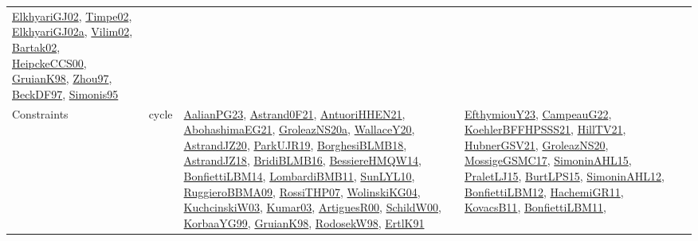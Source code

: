 {\begin{longtable}{lp{3cm}>{\raggedright}p{6cm}>{\raggedright}p{6cm}p{8cm}}
\href{papers/ElkhyariGJ02.pdf}{ElkhyariGJ02}\cite{ElkhyariGJ02}, \href{articles/Timpe02.pdf}{Timpe02}\cite{Timpe02}, \href{papers/ElkhyariGJ02a.pdf}{ElkhyariGJ02a}\cite{ElkhyariGJ02a}, \href{papers/Vilim02.pdf}{Vilim02}\cite{Vilim02}, \href{papers/Bartak02.pdf}{Bartak02}\cite{Bartak02}, \href{articles/HeipckeCCS00.pdf}{HeipckeCCS00}\cite{HeipckeCCS00}, \href{papers/GruianK98.pdf}{GruianK98}\cite{GruianK98}, \href{articles/Zhou97.pdf}{Zhou97}\cite{Zhou97}, \href{papers/BeckDF97.pdf}{BeckDF97}\cite{BeckDF97}, \href{papers/Simonis95.pdf}{Simonis95}\cite{Simonis95}\\
Constraints & cycle & \href{papers/AalianPG23.pdf}{AalianPG23}\cite{AalianPG23}, \href{papers/Astrand0F21.pdf}{Astrand0F21}\cite{Astrand0F21}, \href{papers/AntuoriHHEN21.pdf}{AntuoriHHEN21}\cite{AntuoriHHEN21}, \href{articles/AbohashimaEG21.pdf}{AbohashimaEG21}\cite{AbohashimaEG21}, \href{papers/GroleazNS20a.pdf}{GroleazNS20a}\cite{GroleazNS20a}, \href{articles/WallaceY20.pdf}{WallaceY20}\cite{WallaceY20}, \href{articles/AstrandJZ20.pdf}{AstrandJZ20}\cite{AstrandJZ20}, \href{papers/ParkUJR19.pdf}{ParkUJR19}\cite{ParkUJR19}, \href{articles/BorghesiBLMB18.pdf}{BorghesiBLMB18}\cite{BorghesiBLMB18}, \href{papers/AstrandJZ18.pdf}{AstrandJZ18}\cite{AstrandJZ18}, \href{articles/BridiBLMB16.pdf}{BridiBLMB16}\cite{BridiBLMB16}, \href{papers/BessiereHMQW14.pdf}{BessiereHMQW14}\cite{BessiereHMQW14}, \href{articles/BonfiettiLBM14.pdf}{BonfiettiLBM14}\cite{BonfiettiLBM14}, \href{papers/LombardiBMB11.pdf}{LombardiBMB11}\cite{LombardiBMB11}, \href{papers/SunLYL10.pdf}{SunLYL10}\cite{SunLYL10}, \href{articles/RuggieroBBMA09.pdf}{RuggieroBBMA09}\cite{RuggieroBBMA09}, \href{papers/RossiTHP07.pdf}{RossiTHP07}\cite{RossiTHP07}, \href{papers/WolinskiKG04.pdf}{WolinskiKG04}\cite{WolinskiKG04}, \href{articles/KuchcinskiW03.pdf}{KuchcinskiW03}\cite{KuchcinskiW03}, \href{papers/Kumar03.pdf}{Kumar03}\cite{Kumar03}, \href{articles/ArtiguesR00.pdf}{ArtiguesR00}\cite{ArtiguesR00}, \href{articles/SchildW00.pdf}{SchildW00}\cite{SchildW00}, \href{papers/KorbaaYG99.pdf}{KorbaaYG99}\cite{KorbaaYG99}, \href{papers/GruianK98.pdf}{GruianK98}\cite{GruianK98}, \href{papers/RodosekW98.pdf}{RodosekW98}\cite{RodosekW98}, \href{papers/ErtlK91.pdf}{ErtlK91}\cite{ErtlK91} & \href{papers/EfthymiouY23.pdf}{EfthymiouY23}\cite{EfthymiouY23}, \href{articles/CampeauG22.pdf}{CampeauG22}\cite{CampeauG22}, \href{articles/KoehlerBFFHPSSS21.pdf}{KoehlerBFFHPSSS21}\cite{KoehlerBFFHPSSS21}, \href{papers/HillTV21.pdf}{HillTV21}\cite{HillTV21}, \href{articles/HubnerGSV21.pdf}{HubnerGSV21}\cite{HubnerGSV21}, \href{papers/GroleazNS20.pdf}{GroleazNS20}\cite{GroleazNS20}, \href{papers/MossigeGSMC17.pdf}{MossigeGSMC17}\cite{MossigeGSMC17}, \href{articles/SimoninAHL15.pdf}{SimoninAHL15}\cite{SimoninAHL15}, \href{papers/PraletLJ15.pdf}{PraletLJ15}\cite{PraletLJ15}, \href{papers/BurtLPS15.pdf}{BurtLPS15}\cite{BurtLPS15}, \href{papers/SimoninAHL12.pdf}{SimoninAHL12}\cite{SimoninAHL12}, \href{papers/BonfiettiLBM12.pdf}{BonfiettiLBM12}\cite{BonfiettiLBM12}, \href{articles/HachemiGR11.pdf}{HachemiGR11}\cite{HachemiGR11}, \href{articles/KovacsB11.pdf}{KovacsB11}\cite{KovacsB11}, \href{papers/BonfiettiLBM11.pdf}{BonfiettiLBM11}\cite{BonfiettiLBM11}, 
\end{longtable}}

